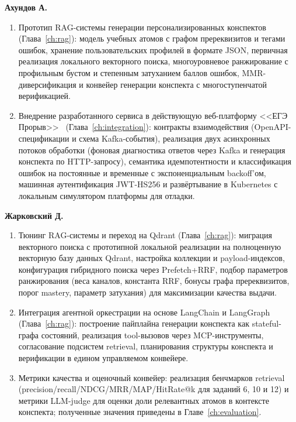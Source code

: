 \documentclass[a4paper,12pt]{extarticle}
\begin{document}
\textbf{Ахундов А.}
\begin{enumerate}
    \item Прототип RAG-системы генерации персонализированных конспектов
        (Глава~\ref{ch:rag}): модель учебных атомов с графом пререквизитов
        и тегами ошибок, хранение пользовательских профилей в формате JSON,
        первичная реализация локального векторного поиска, многоуровневое
        ранжирование с профильным бустом и степенным затуханием баллов ошибок,
        MMR-диверсификация и конвейер генерации конспекта с многоступенчатой
        верификацией.
    \item Внедрение разработанного сервиса в действующую веб-платформу
	    <<ЕГЭ Прорыв>>~\cite{exambreakout2026} (Глава~\ref{ch:integration}): контракты взаимодействия
        (OpenAPI-спецификации и схема Kafka-события), реализация двух
        асинхронных потоков обработки (фоновая диагностика ответов через Kafka
        и генерация конспекта по HTTP-запросу), семантика идемпотентности и
        классификация ошибок на постоянные и временные с экспоненциальным
        backoff'ом, машинная аутентификация JWT-HS256 и развёртывание в
        Kubernetes с локальным симулятором платформы для отладки.
\end{enumerate}

\textbf{Жарковский Д.}
\begin{enumerate}
    \item Тюнинг RAG-системы и переход на Qdrant (Глава~\ref{ch:rag}):
        миграция векторного поиска с прототипной локальной реализации на
        полноценную векторную базу данных Qdrant, настройка коллекции и
        payload-индексов, конфигурация гибридного поиска через Prefetch+RRF,
        подбор параметров ранжирования (веса каналов, константа RRF, бонусы
        графа пререквизитов, порог mastery, параметр затухания) для
        максимизации качества выдачи.
    \item Интеграция агентной оркестрации на основе LangChain и LangGraph
        (Глава~\ref{ch:rag}): построение пайплайна генерации конспекта как
        stateful-графа состояний, реализация tool-вызовов через MCP-инструменты,
        согласование подсистем retrieval, планирования структуры конспекта и
        верификации в едином управляемом конвейере.
    \item Метрики качества и оценочный конвейер: реализация бенчмарков
        retrieval (precision/recall/NDCG/MRR/MAP/HitRate@k для заданий 6, 10
        и 12) и метрики LLM-judge для оценки доли релевантных атомов в
        контексте конспекта; полученные значения приведены в Главе~\ref{ch:evaluation}.
\end{enumerate}
\end{document}
